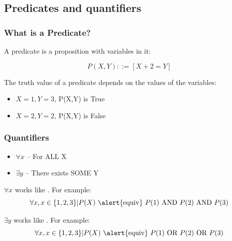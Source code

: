 \documentclass{beamer}
\begin{document}
\subsection{Predicates and quantifiers}
\begin{frame}
  \frametitle{What is a Predicate?}

  A predicate is a proposition with variables in it:

  \begin{equation*}
    P(X,Y) ::= [X+2 = Y]
  \end{equation*}

  \vfill

  The truth value of a predicate depends on the values of the variables:
  \begin{itemize}
  \item $X = 1, Y = 3$, P(X,Y) is True
  \item $X = 2, Y = 2$, P(X,Y) is False
  \end{itemize}
\end{frame}

\begin{frame}
  \frametitle{Quantifiers}

  \begin{itemize}
  \item $\forall x$ -- For ALL X
    
    \bigskip
    
  \item $\exists y$ -- There exists SOME Y
  \end{itemize}

  \vfill

  $\forall x$ works like . For example:
  \begin{equation*}
    \forall x, x \in \{1,2,3\}|P(X) \text{ \alert{equiv} } P(1) \text{ AND } P(2) \text{ AND } P(3)
  \end{equation*}

  \bigskip

  $\exists y$ works like . For example:
  \begin{equation*}
    \forall x, x \in \{1,2,3\}|P(X) \text{ \alert{equiv} } P(1) \text{ OR } P(2) \text{ OR } P(3)
  \end{equation*}
\end{frame}
\end{document}
